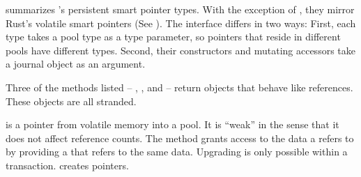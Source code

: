  summarizes \this{}'s persistent smart pointer types.  With
the exception of , they mirror Rust's volatile smart pointers (See
).  The interface differs in two ways: First, each type
takes a pool type as a type parameter, so pointers that reside in different
pools have different types.  Second, their constructors and mutating accessors
take a journal object as an argument.

Three of the methods listed --
, , and
 -- return objects that behave like references.  These
objects are all stranded. %

 is a pointer from volatile memory into a pool.  It is ``weak'' in
the sense that it does not affect reference counts.  The  method
grants access to the data a  refers to by providing a 
that refers to the same data.  Upgrading is only possible within a transaction.
 creates  pointers.

